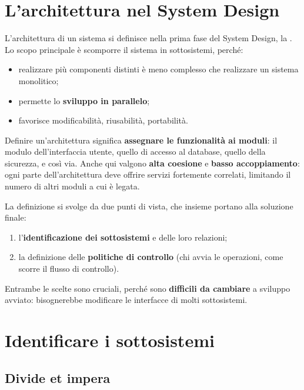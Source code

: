 \section{L'architettura nel System Design}

L'architettura di un sistema si definisce nella prima fase del System Design, la .
Lo scopo principale è scomporre il sistema in sottosistemi, perché:
\begin{itemize}
  \item realizzare più componenti distinti è meno complesso che realizzare un sistema monolitico;
  \item permette lo \textbf{sviluppo in parallelo};
  \item favorisce modificabilità, riusabilità, portabilità.
\end{itemize}

Definire un'architettura significa \textbf{assegnare le funzionalità ai moduli}: il modulo dell'interfaccia utente, quello
di accesso al database, quello della sicurezza, e così via. Anche qui valgono \textbf{alta coesione} e \textbf{basso
accoppiamento}: ogni parte dell'architettura deve offrire servizi fortemente correlati, limitando il numero di altri
moduli a cui è legata.

La definizione si svolge da due punti di vista, che insieme portano alla soluzione finale:
\begin{enumerate}
  \item l'\textbf{identificazione dei sottosistemi} e delle loro relazioni;
  \item la definizione delle \textbf{politiche di controllo} (chi avvia le operazioni, come scorre il flusso di controllo).
\end{enumerate}
Entrambe le scelte sono cruciali, perché sono \textbf{difficili da cambiare} a sviluppo avviato: bisognerebbe modificare
le interfacce di molti sottosistemi.

\section{Identificare i sottosistemi}

\subsection{Divide et impera}

